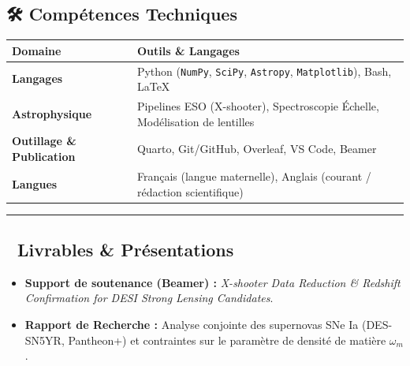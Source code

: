\documentclass[
]{article}
\newcounter{none} %
\providecommand{\tightlist}{%
  \setlength{\itemsep}{0pt}\setlength{\parskip}{0pt}}
\begin{document}
\subsection{🛠️ Compétences Techniques}\label{compuxe9tences-techniques}

{\def\LTcaptype{none} %
\begin{longtable}[]{@{}
  >{\raggedright\arraybackslash}p{}
  >{\raggedright\arraybackslash}p{}@{}}
\toprule\noalign{}
\begin{minipage}[b]{\linewidth}\raggedright
Domaine
\end{minipage} & \begin{minipage}[b]{\linewidth}\raggedright
Outils \& Langages
\end{minipage} \\
\midrule\noalign{}
\endhead
\bottomrule\noalign{}
\endlastfoot
\textbf{Langages} & Python (\texttt{NumPy}, \texttt{SciPy},
\texttt{Astropy}, \texttt{Matplotlib}), Bash, LaTeX \\
\textbf{Astrophysique} & Pipelines ESO (X-shooter), Spectroscopie
Échelle, Modélisation de lentilles \\
\textbf{Outillage \& Publication} & Quarto, Git/GitHub, Overleaf, VS
Code, Beamer \\
\textbf{Langues} & Français (langue maternelle), Anglais (courant /
rédaction scientifique) \\
\end{longtable}
}

\begin{center}\rule{0.5\linewidth}{0.5pt}\end{center}

\subsection{📄 Livrables \&
Présentations}\label{livrables-pruxe9sentations}

\begin{itemize}
\tightlist
\item
  \textbf{Support de soutenance (Beamer) :} \emph{X-shooter Data
  Reduction \& Redshift Confirmation for DESI Strong Lensing
  Candidates}.
\item
  \textbf{Rapport de Recherche :} Analyse conjointe des supernovas SNe
  Ia (DES-SN5YR, Pantheon+) et contraintes sur le paramètre de densité
  de matière \(\omega_m\).
\end{itemize}
\end{document}
